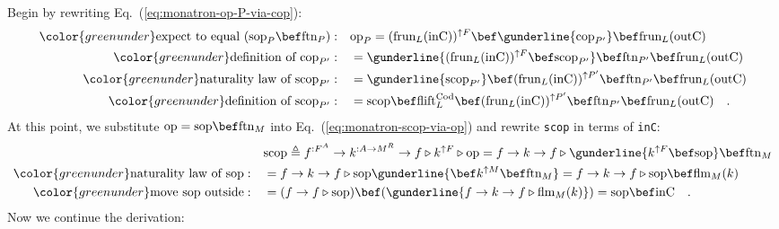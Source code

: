 Begin by rewriting Eq.~(\ref{eq:monatron-op-P-via-cop}):
\begin{align*}
{\color{greenunder}\text{expect to equal }(\text{sop}_{P}\bef\text{ftn}_{P}):}\quad & \text{op}_{P}=(\text{frun}_{L}(\text{inC}))^{\uparrow F}\bef\gunderline{\text{cop}_{P^{\prime}}}\bef\text{frun}_{L}(\text{outC})\\
{\color{greenunder}\text{definition of }\text{cop}_{P^{\prime}}:}\quad & =\gunderline{(\text{frun}_{L}(\text{inC}))^{\uparrow F}\bef\text{scop}_{P^{\prime}}}\bef\text{ftn}_{P^{\prime}}\bef\text{frun}_{L}(\text{outC})\\
{\color{greenunder}\text{naturality law of }\text{scop}_{P^{\prime}}:}\quad & =\gunderline{\text{scop}_{P^{\prime}}}\bef(\text{frun}_{L}(\text{inC}))^{\uparrow P^{\prime}}\bef\text{ftn}_{P^{\prime}}\bef\text{frun}_{L}(\text{outC})\\
{\color{greenunder}\text{definition of }\text{scop}_{P^{\prime}}:}\quad & =\text{scop}\bef\text{flift}_{L}^{\text{Cod}}\bef(\text{frun}_{L}(\text{inC}))^{\uparrow P^{\prime}}\bef\text{ftn}_{P^{\prime}}\bef\text{frun}_{L}(\text{outC})\quad.
\end{align*}
At this point, we substitute $\text{op}=\text{sop}\bef\text{ftn}_{M}$
into Eq.~(\ref{eq:monatron-scop-via-op}) and rewrite \lstinline!scop!
in terms of \lstinline!inC!:
\begin{align*}
 & \text{scop}\triangleq f^{:F^{A}}\rightarrow k^{:A\rightarrow M^{R}}\rightarrow f\triangleright k^{\uparrow F}\triangleright\text{op}=f\rightarrow k\rightarrow f\triangleright\gunderline{k^{\uparrow F}\bef\text{sop}}\bef\text{ftn}_{M}\\
{\color{greenunder}\text{naturality law of }\text{sop}:}\quad & =f\rightarrow k\rightarrow f\triangleright\text{sop}\gunderline{\bef k^{\uparrow M}\bef\text{ftn}_{M}}=f\rightarrow k\rightarrow f\triangleright\text{sop}\bef\text{flm}_{M}(k)\\
{\color{greenunder}\text{move }\text{sop}\text{ outside}:}\quad & =(f\rightarrow f\triangleright\text{sop})\bef(\gunderline{f\rightarrow k\rightarrow f\triangleright\text{flm}_{M}(k)})=\text{sop}\bef\text{inC}\quad.
\end{align*}
Now we continue the derivation:
